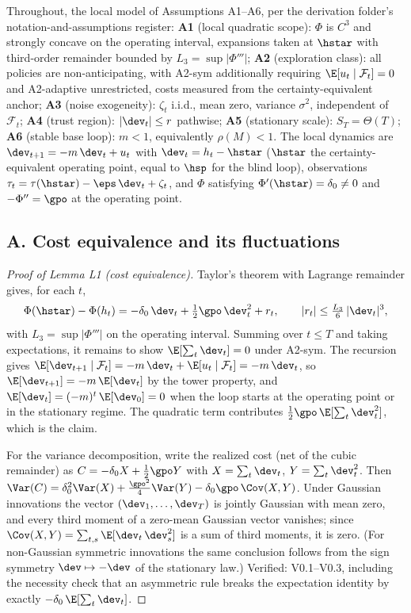 
Throughout, the local model of Assumptions A1--A6, per the derivation
folder's notation-and-assumptions register:
\textbf{A1} (local quadratic scope): $\Phi$ is $C^3$ and strongly concave
on the operating interval, expansions taken at $\hstar$ with third-order
remainder bounded by $L_3 = \sup|\Phi'''|$;
\textbf{A2} (exploration class): all policies are non-anticipating, with
A2-sym additionally requiring $\E[u_t \mid \mathcal{F}_t] = 0$ and
A2-adaptive unrestricted, costs measured from the certainty-equivalent
anchor;
\textbf{A3} (noise exogeneity): $\zeta_t$ i.i.d., mean zero, variance
$\sigma^2$, independent of $\mathcal{F}_t$;
\textbf{A4} (trust region): $|\dev_t| \le r$ pathwise;
\textbf{A5} (stationary scale): $S_T = \Theta(T)$;
\textbf{A6} (stable base loop): $m < 1$, equivalently $\rho(M) < 1$.
The local dynamics are $\dev_{t+1} = -m\,\dev_t + u_t$ with
$\dev_t = h_t - \hstar$ ($\hstar$ the certainty-equivalent operating
point, equal to $\hsp$ for the blind loop), observations
$\tau_t = \tau(\hstar) - \eps\,\dev_t + \zeta_t$, and $\Phi$ satisfying
$\Phi'(\hstar) = \delta_0 \neq 0$ and $-\Phi'' = \gpo$ at the operating
point.

\subsection*{A. Cost equivalence and its fluctuations}

\begin{proof}[Proof of Lemma L1 (cost equivalence)]
Taylor's theorem with Lagrange remainder gives, for each $t$,
\[
\Phi(\hstar) - \Phi(h_t)
 = -\delta_0\,\dev_t + \tfrac{1}{2}\gpo\,\dev_t^2 + r_t,
 \qquad |r_t| \le \tfrac{L_3}{6}\,|\dev_t|^3,
\]
with $L_3 = \sup |\Phi'''|$ on the operating interval. Summing over
$t \le T$ and taking expectations, it remains to show
$\E[\sum_t \dev_t] = 0$ under A2-sym. The recursion gives
$\E[\dev_{t+1} \mid \mathcal{F}_t] = -m\,\dev_t + \E[u_t \mid \mathcal{F}_t]
= -m\,\dev_t$, so $\E[\dev_{t+1}] = -m\,\E[\dev_t]$ by the tower property,
and $\E[\dev_t] = (-m)^t\,\E[\dev_0] = 0$ when the loop starts at the
operating point or in the stationary regime. The quadratic term contributes
$\tfrac{1}{2}\gpo\,\E[\sum_t \dev_t^2]$, which is the claim.

For the variance decomposition, write the realized cost (net of the cubic
remainder) as $C = -\delta_0 X + \tfrac{1}{2}\gpo Y$ with
$X = \sum_t \dev_t$, $Y = \sum_t \dev_t^2$. Then
$\Var(C) = \delta_0^2 \Var(X) + \tfrac{\gpo^2}{4}\Var(Y)
- \delta_0\gpo\,\Cov(X, Y)$. Under Gaussian innovations the vector
$(\dev_1,\dots,\dev_T)$ is jointly Gaussian with mean zero, and every third
moment of a zero-mean Gaussian vector vanishes; since
$\Cov(X,Y) = \sum_{t,s}\E[\dev_t\,\dev_s^2]$ is a sum of third moments, it is
zero. (For non-Gaussian symmetric innovations the same conclusion follows
from the sign symmetry $\dev \mapsto -\dev$ of the stationary law.)
Verified: V0.1--V0.3, including the necessity check that an asymmetric rule
breaks the expectation identity by exactly $-\delta_0\,\E[\sum_t \dev_t]$.
\end{proof}

